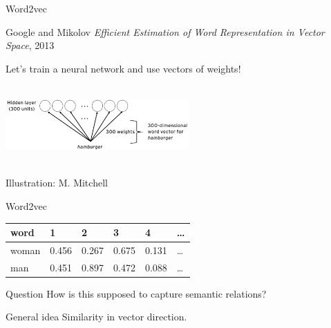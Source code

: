 \documentclass[
  10pt,
  ignorenonframetext,
  x11names, dvipsnames, bibspacing,natbib, table]{beamer}
\begin{document}
\begin{frame}{Word2vec}
\protect\hypertarget{word2vec-6}{}
\begin{block}{Google and Mikolov}
\protect\hypertarget{google-and-mikolov-1}{}
\emph{Efficient Estimation of Word Representation in Vector Space}, 2013

Let's train a neural network and use vectors of weights!

\begin{center}
 \includegraphics[height = 3cm, width = 7cm]{images/word2vec2.png}
\end{center}

\vspace{-3mm}

\tiny \hfill \color{gray}Illustration: M. Mitchell \color{black}
\end{block}
\end{frame}

\begin{frame}{Word2vec}
\protect\hypertarget{word2vec-7}{}
\begin{longtable}[]{@{}llllll@{}}
\toprule
word & 1 & 2 & 3 & 4 & \ldots{} \\
\midrule
\endhead
woman & 0.456 & 0.267 & 0.675 & 0.131 & \ldots{} \\
man & 0.451 & 0.897 & 0.472 & 0.088 & \ldots{} \\
\bottomrule
\end{longtable}

\begin{block}{Question}
\protect\hypertarget{question-1}{}
How is this supposed to capture semantic relations?

\pause
\end{block}

\begin{block}{General idea}
\protect\hypertarget{general-idea}{}
Similarity in vector direction.
\end{block}
\end{frame}
\end{document}
